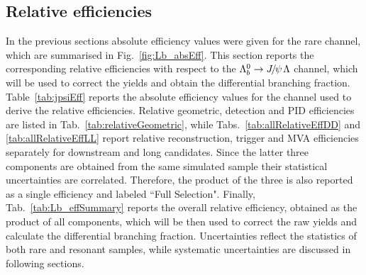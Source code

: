 \subsection{Relative efficiencies}

In the previous sections absolute efficiency values were given for the rare channel, which are summarised in Fig.~\ref{fig:Lb_absEff}.
This section reports the corresponding relative efficiencies with respect to the $\Lb\to\jpsi\Lz$ channel, which will be
used to correct the yields and obtain the differential branching fraction. Table~\ref{tab:jpsiEff} reports the absolute 
efficiency values for the \jpsi channel used to derive the relative efficiencies.
Relative geometric, detection and PID efficiencies are listed in Tab.~\ref{tab:relativeGeometric}, while
Tabs.~\ref{tab:allRelativeEffDD} and \ref{tab:allRelativeEffLL} report relative reconstruction, trigger and MVA efficiencies 
separately for downstream and long candidates. Since the latter three components are obtained from the 
same simulated sample their statistical uncertainties are correlated. Therefore, the product of the three is also reported 
as a single efficiency and labeled ``Full Selection". Finally, Tab.~\ref{tab:Lb_effSummary} reports the overall relative efficiency, obtained 
as the product of all components, which will be then used to correct the raw yields and calculate the differential branching fraction.
Uncertainties reflect the statistics of both rare and resonant samples, while systematic uncertainties are discussed in following sections.

\begin{table}
\centering
\caption{Absolute efficiency values for $\Lb\to\jpsi\Lz$; uncertainties are statistical only.}
\label{tab:jpsiEff}
\end{table}


